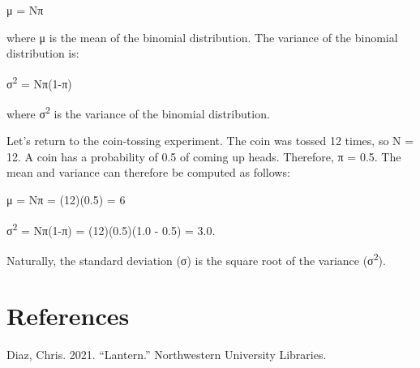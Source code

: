 \documentclass[
  11pt,
,
onecolumn,
openany
]{book}
\newenvironment{CSLReferences}%
  {}%
  {\par}
\begin{document}
μ = Nπ

where μ is the mean of the binomial distribution. The variance of the binomial
distribution is:

σ\textsuperscript{2} = Nπ(1-π)

where σ\textsuperscript{2} is the variance of the binomial distribution.

Let's return to the coin-tossing experiment. The coin was tossed 12 times, so
N = 12. A coin has a probability of 0.5 of coming up heads. Therefore, π =
0.5. The mean and variance can therefore be computed as follows:

μ = Nπ = (12)(0.5) = 6

σ\textsuperscript{2} = Nπ(1-π) = (12)(0.5)(1.0 - 0.5) = 3.0.

Naturally, the standard deviation (σ) is the square root of the variance
(σ\textsuperscript{2}).

\hypertarget{bibliography}{%
\chapter*{References}\label{bibliography}}

\hypertarget{refs}{}
\begin{CSLReferences}{1}{0}
\leavevmode{}%
Diaz, Chris. 2021. {``Lantern.''} Northwestern University Libraries.

\end{CSLReferences}
\end{document}
